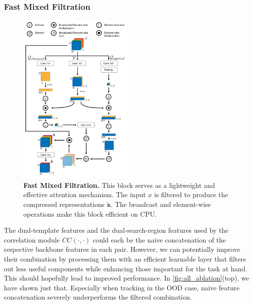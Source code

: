 \subsubsection{Fast Mixed Filtration}
\begin{figure}[t]
  \centering
  \includegraphics[width=0.5\textwidth]{figures/figure7.pdf}
   \caption{\textbf{Fast Mixed Filtration.} This block serves as a lightweight and effective attention mechanism. The input $x$ is filtered to produce the compressed representations $\boldsymbol{\check{x}}$. The broadcast and element-wise operations make this block efficient on CPU. }
   \label{fig:attention2}
\end{figure}
The dual-template features and the dual-search-region features used by the correlation module $CC(\cdot,\cdot)$ could each be the naive concatenation of the respective backbone features in each pair. However, we can potentially improve their combination by processing them with an efficient learnable layer that filters out less useful components while enhancing those important for the task at hand. This should hopefully lead to improved performance. In \ref{fig:all_ablation}(top), we have shown just that. Especially when tracking in the OOD case, naive feature concatenation severely underperforms the filtered combination.\\

